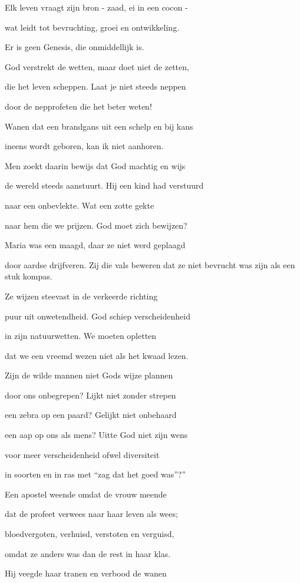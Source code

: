 Elk leven vraagt zijn bron
- zaad, ei in een cocon -

wat leidt tot bevruchting,
groei en ontwikkeling.

Er is geen Genesis,
die onmiddellijk is.

God verstrekt de wetten,
maar doet niet de zetten,

die het leven scheppen.
Laat je niet steeds neppen

door de nepprofeten
die het beter weten!

Wanen dat een brandgans
uit een schelp en bij kans

ineens wordt geboren,
kan ik niet aanhoren.

Men zoekt daarin bewijs
dat God machtig en wijs

de wereld steeds aanstuurt.
Hij een kind had verstuurd

naar een onbevlekte.
Wat een zotte gekte

naar hem die we prijzen.
God moet zich bewijzen?

Maria was een maagd,
daar ze niet werd geplaagd

door aardse drijfveren.
Zij die vals beweren
dat ze niet bevrucht was
zijn als een stuk kompas.

Ze wijzen steevast in
de verkeerde richting

puur uit onwetendheid.
God schiep verscheidenheid

in zijn natuurwetten.
We moeten opletten

dat we een vreemd wezen
niet als het kwaad lezen.

Zijn de wilde mannen
niet Gods wijze plannen

door ons onbegrepen?
Lijkt niet zonder strepen

een zebra op een paard?
Gelijkt niet onbehaard

een aap op ons als mens?
Uitte God niet zijn wens

voor meer verscheidenheid
ofwel diversiteit

in soorten en in ras
met “zag dat het goed was”?”

Een apostel weende
omdat de vrouw meende

dat de profeet verwees
naar haar leven als wees;

bloedvergoten, verhuisd,
verstoten en verguisd,

omdat ze anders was
dan de rest in haar klas.

Hij veegde haar tranen
en verbood de wanen

